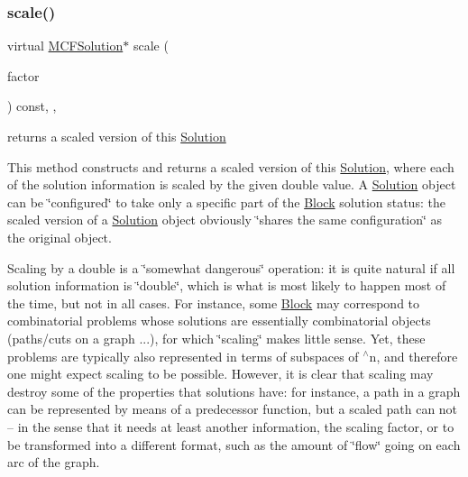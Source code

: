 \subsubsection{\texorpdfstring{scale()}{scale()}}
{\footnotesize\ttfamily virtual \mbox{\hyperlink{class_s_m_spp__di__unipi__it_1_1_m_c_f_solution}{M\+C\+F\+Solution}}$\ast$ scale (\begin{DoxyParamCaption}\item[{double}]{factor }\end{DoxyParamCaption}) const\hspace{0.3cm}{\ttfamily [final]}, {\ttfamily [override]}, {\ttfamily [virtual]}}



returns a scaled version of this \mbox{\hyperlink{class_s_m_spp__di__unipi__it_1_1_solution}{Solution}} 

This method constructs and returns a scaled version of this \mbox{\hyperlink{class_s_m_spp__di__unipi__it_1_1_solution}{Solution}}, where each of the solution information is scaled by the given double value. A \mbox{\hyperlink{class_s_m_spp__di__unipi__it_1_1_solution}{Solution}} object can be \char`\"{}configured\char`\"{} to take only a specific part of the \mbox{\hyperlink{class_s_m_spp__di__unipi__it_1_1_block}{Block}} solution status\+: the scaled version of a \mbox{\hyperlink{class_s_m_spp__di__unipi__it_1_1_solution}{Solution}} object obviously \char`\"{}shares the same configuration\char`\"{} as the original object.

Scaling by a double is a \char`\"{}somewhat dangerous\char`\"{} operation\+: it is quite natural if all solution information is \char`\"{}double\char`\"{}, which is what is most likely to happen most of the time, but not in all cases. For instance, some \mbox{\hyperlink{class_s_m_spp__di__unipi__it_1_1_block}{Block}} may correspond to combinatorial problems whose solutions are essentially combinatorial objects (paths/cuts on a graph ...), for which \char`\"{}scaling\char`\"{} makes little sense. Yet, these problems are typically also represented in terms of subspaces of $^\wedge$n, and therefore one might expect scaling to be possible. However, it is clear that scaling may destroy some of the properties that solutions have\+: for instance, a path in a graph can be represented by means of a predecessor function, but a scaled path can not -- in the sense that it needs at least another information, the scaling factor, or to be transformed into a different format, such as the amount of \char`\"{}flow\char`\"{} going on each arc of the graph.

